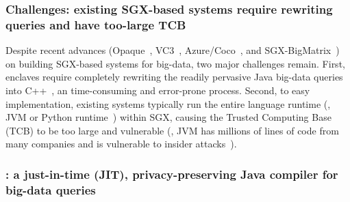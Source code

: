 \vspace{-.15in}
\subsubsection{Challenges: existing SGX-based systems require rewriting 
queries and have too-large TCB} 
\label{sec:ift-problem}\vspace{-.075in}

Despite recent advances (Opaque~\cite{opaque:nsdi17}, VC3~\cite{vc3:sp15}, 
Azure/Coco~\cite{azure:coco}, and SGX-BigMatrix~\cite{bigmatrix:ccs17}) on 
building SGX-based systems for big-data, two major challenges 
remain. First, enclaves require completely rewriting the readily pervasive Java 
big-data queries into C++~\cite{opaque:nsdi17,vc3:sp15,azure:coco}, an 
time-consuming and error-prone process. 
Second, to easy implementation, existing systems typically run the entire 
language runtime (\eg, JVM or Python runtime~\cite{bigmatrix:ccs17}) within SGX, 
causing the Trusted Computing Base (TCB) to be too large and vulnerable (\eg, 
JVM has millions of lines of code from many companies and is vulnerable to 
insider attacks~\cite{top-threats}).

\vspace{-.15in}
\subsubsection{\maat: a just-in-time (JIT), privacy-preserving Java compiler 
for big-data queries} 
\label{sec:ift-problem}\vspace{-.075in}

